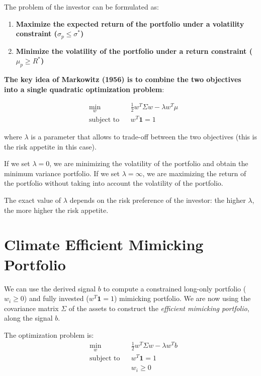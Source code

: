 The problem of the investor can be formulated as:

\begin{enumerate}
    \item \textbf{Maximize the expected return of the portfolio
    under a volatility constraint ($\sigma_p \leq \sigma^*$)}
    \item \textbf{Minimize the volatility of the portfolio under a
    return constraint ($\mu_p \geq R^*$)}
\end{enumerate}

\textbf{The key idea of Markowitz (1956) is to combine 
the two objectives into a single quadratic optimization problem}:

\begin{equation}
    \begin{aligned}
        & \underset{w}{\min}
        & &  \frac{1}{2} w^T \Sigma w - \lambda w^T \mu \\
        & \text{subject to}
        & & w^T \mathbf{1} = 1
    \end{aligned}
\end{equation}
    
where $\lambda$ is a parameter that allows to trade-off
between the two objectives (this is the risk appetite in this case).

If we set $\lambda = 0$, we are minimizing the volatility of the portfolio
and obtain the minimum variance portfolio.
If we set $\lambda = \infty$, we are maximizing the return of the portfolio
without taking into account the volatility of the portfolio.

The exact value of $\lambda$ depends on the risk 
preference of the investor: the higher $\lambda$, the more
higher the risk appetite.

\section{Climate Efficient Mimicking Portfolio}

We can use the derived signal $b$ to compute 
a constrained long-only portfolio ($w_i \geq 0$)
and fully invested ($w^T \mathbf{1} = 1$) mimicking 
portfolio. 
We are now using the covariance matrix $\Sigma$ of the assets
to construct the \textit{efficient mimicking portfolio}, 
along the signal $b$.

The optimization problem is:
\begin{equation}
    \begin{aligned}
        & \underset{w}{\min}
        & &  \frac{1}{2} w^T \Sigma w - \lambda w^T b \\
        & \text{subject to}
        & & w^T \mathbf{1} = 1 \\
        & & & w_i \geq 0
    \end{aligned}
\end{equation}


